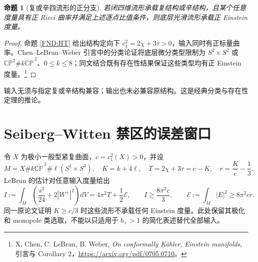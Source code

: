 \documentclass[UTF8,fontset=fandol,zihao=-4,oneside,openany]{ctexbook}
\theoremstyle{cjkplain}
\newtheorem{proposition}[theorem]{命题}
\numberwithin{equation}{chapter}
\begin{document}
\begin{proposition}[复或辛四流形的正分支]\label{FND:positive}
若闭四维流形承载复结构或辛结构，且某个任意度量具有正 Ricci 曲率并满足上述逐点比值条件，则底层光滑流形承载正 Einstein 度量。
\end{proposition}
\begin{proof}
命题 \ref{FND:HT} 给出结构定向下 \(c_1^2=2\chi+3\tau>0\)，输入同时有正标量曲率。Chen--LeBrun--Weber 引言中的分类论证将底层微分类型限制为
\(S^2\times S^2\) 或
\(\mathbb{CP}^2\#k\overline{\mathbb{CP}}^{\,2}\)、\(0\le k\le8\)；同文结合既有存在性结果保证这些类型均有正 Einstein 度量。\footnote{X. Chen, C. LeBrun, B. Weber, \emph{On conformally Kähler, Einstein manifolds}, 引言与 Corollary 2，\url{https://arxiv.org/pdf/0705.0710}。}
\end{proof}
输入无须与指定复或辛结构兼容；输出也未必兼容原结构。这是经典分类与存在性定理的推论。

\section{Seiberg--Witten 禁区的误差窗口}
令 \(X\) 为极小一般型紧复曲面，\(c=c_1^2(X)>0\)，并设
\[
M=X\#k\overline{\mathbb{CP}}^{\,2}\#\ell(S^1\times S^3),
\quad K=k+4\ell,\quad
T=2\chi+3\tau=c-K,\quad r=\frac Kc-\frac13.
\]
LeBrun 的估计对任意输入度量给出
\[
I:=\int_M\left(\frac{s^2}{24}+2|W^+|^2\right)dV
=4\pi^2T+\frac12\mathcal E,\qquad
I\ge\frac{8\pi^2c}{3},\qquad
\mathcal E:=\int_M|E|^2\ge8\pi^2cr .
\]
同一原论文证明 \(K\ge c/3\) 时这些流形不承载任何 Einstein 度量。此处保留其极化和 monopole 类选取，不能以只适用于 \(b_+>1\) 的简化表述替代全部输入。
\end{document}
